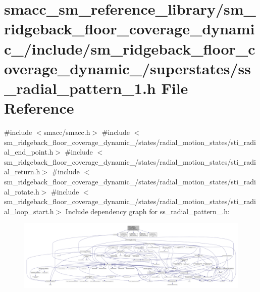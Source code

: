 \hypertarget{sm__ridgeback__floor__coverage__dynamic__1_2include_2sm__ridgeback__floor__coverage__dynamic__1_d272cd36ad3ea4ac468a089b0de789d4}{}\section{smacc\+\_\+sm\+\_\+reference\+\_\+library/sm\+\_\+ridgeback\+\_\+floor\+\_\+coverage\+\_\+dynamic\+\_/include/sm\+\_\+ridgeback\+\_\+floor\+\_\+coverage\+\_\+dynamic\+\_/superstates/ss\+\_\+radial\+\_\+pattern\+\_\+1.h File Reference}
\label{sm__ridgeback__floor__coverage__dynamic__1_2include_2sm__ridgeback__floor__coverage__dynamic__1_d272cd36ad3ea4ac468a089b0de789d4}
{\ttfamily \#include $<$smacc/smacc.\+h$>$}\newline
{\ttfamily \#include $<$sm\+\_\+ridgeback\+\_\+floor\+\_\+coverage\+\_\+dynamic\+\_/states/radial\+\_\+motion\+\_\+states/sti\+\_\+radial\+\_\+end\+\_\+point.\+h$>$}\newline
{\ttfamily \#include $<$sm\+\_\+ridgeback\+\_\+floor\+\_\+coverage\+\_\+dynamic\+\_/states/radial\+\_\+motion\+\_\+states/sti\+\_\+radial\+\_\+return.\+h$>$}\newline
{\ttfamily \#include $<$sm\+\_\+ridgeback\+\_\+floor\+\_\+coverage\+\_\+dynamic\+\_/states/radial\+\_\+motion\+\_\+states/sti\+\_\+radial\+\_\+rotate.\+h$>$}\newline
{\ttfamily \#include $<$sm\+\_\+ridgeback\+\_\+floor\+\_\+coverage\+\_\+dynamic\+\_/states/radial\+\_\+motion\+\_\+states/sti\+\_\+radial\+\_\+loop\+\_\+start.\+h$>$}\newline
Include dependency graph for ss\+\_\+radial\+\_\+pattern\+\_.\+h\+:
\nopagebreak
\begin{figure}[H]
\begin{center}
\leavevmode
\includegraphics[width=350pt]{sm__ridgeback__floor__coverage__dynamic__1_2include_2sm__ridgeback__floor__coverage__dynamic__1_0f97631f9582c4f2c666d4f99235333e}
\end{center}
\end{figure}
